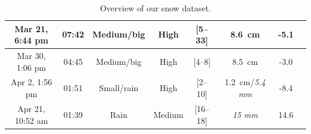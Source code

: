 \begin{table}[htbp]
\begin{tabular}{|c|c|c|c|c|c|c|c|}
        Mar 21, 6:44 pm    &  07:42            & Medium/big          & High             & [5--33]                         & \SI{8.6}{\cm}                 & -5.1  \\\hline
        Mar 30, 1:06 pm    &  04:45            & Medium/big          & High             & [4--8]                          & \SI{8.5}{\cm}                 & -3.0  \\\hline
        Apr 2, 1:56 pm     &  01:51            & Small/rain          & High             & [2--10]                         & \SI{1.2}{\cm}/\textit{5.4 mm} & -8.4  \\\hline
        Apr 21, 10:52 am   &  01:39            & Rain                & Medium           & [16--18]                        & \textit{15 mm}                & 14.6  \\\hline
    \end{tabular}
    \caption{Overview of our snow dataset.}
    \label{tab:overview-dataset}
\end{table}

